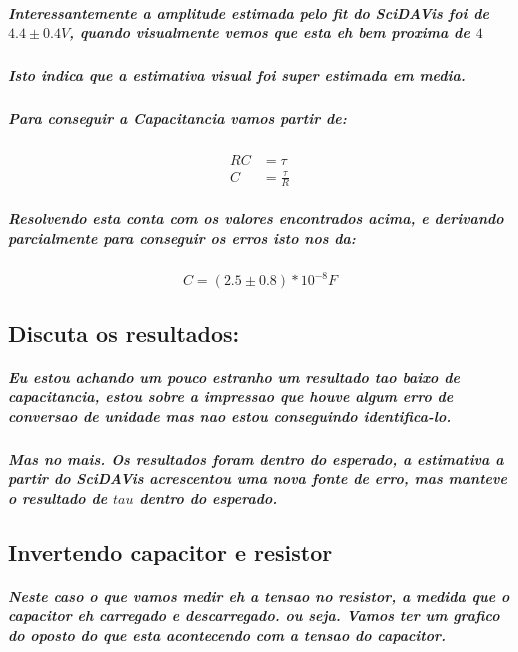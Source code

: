 \documentclass[12pt,twoside, a4paper, twocolumn]{article}
\begin{document}
\subparagraph*{Interessantemente a amplitude estimada pelo fit do SciDAVis foi de $4.4 \pm 0.4V$, quando visualmente vemos que esta eh bem proxima de $4$ }

\subparagraph*{Isto indica que a estimativa visual foi super estimada em media.}

\subparagraph*{Para conseguir a Capacitancia vamos partir de:}

\begin{equation}
    \begin{aligned}
        RC & = \tau           \\
        C  & = \frac{\tau}{R}
    \end{aligned}
\end{equation}

\subparagraph*{Resolvendo esta conta com os valores encontrados acima, e derivando parcialmente para conseguir os erros isto nos da:}

\begin{equation*}
    C = (2.5  \pm 0.8) * 10^{-8} F
\end{equation*}

\subsection{Discuta os resultados:}

\subparagraph*{Eu estou achando um pouco estranho um resultado tao baixo de capacitancia, estou sobre a impressao que houve algum erro de conversao de unidade mas nao estou conseguindo identifica-lo.}

\subparagraph*{Mas no mais. Os resultados foram dentro do esperado, a estimativa a partir do SciDAVis acrescentou uma nova fonte de erro, mas manteve o resultado de $tau$ dentro do esperado.}

\subsection{Invertendo capacitor e resistor}

\subparagraph*{Neste caso o que vamos medir eh a tensao no resistor, a medida que o capacitor eh carregado e descarregado. ou seja. Vamos ter um grafico do oposto do que esta acontecendo com a tensao do capacitor.}

\clearpage
\end{document}
